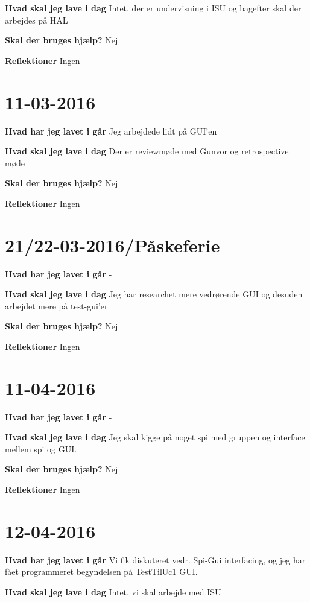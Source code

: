 \documentclass{article}
\begin{document}
	\textbf{Hvad skal jeg lave i dag} Intet, der er undervisning i ISU og bagefter skal der arbejdes på HAL
	
	\textbf{Skal der bruges hjælp?} Nej
	
	\textbf{Reflektioner} Ingen
	
	\section{11-03-2016}
	
	\textbf{Hvad har jeg lavet i går} Jeg arbejdede lidt på GUI'en
	
	\textbf{Hvad skal jeg lave i dag} Der er reviewmøde med Gunvor og retrospective møde
	
	\textbf{Skal der bruges hjælp?} Nej
	
	\textbf{Reflektioner} Ingen
	
	\section{21/22-03-2016/Påskeferie}
	
	\textbf{Hvad har jeg lavet i går} -
	
	\textbf{Hvad skal jeg lave i dag} Jeg har researchet mere vedrørende GUI og desuden arbejdet mere på test-gui'er
	
	\textbf{Skal der bruges hjælp?} Nej
	
	\textbf{Reflektioner} Ingen
	
	\section{11-04-2016}
		
	\textbf{Hvad har jeg lavet i går} -
		
	\textbf{Hvad skal jeg lave i dag} Jeg skal kigge på noget spi med gruppen og interface mellem spi og GUI.
		
	\textbf{Skal der bruges hjælp?} Nej
		
	\textbf{Reflektioner} Ingen
	
	
	\section{12-04-2016}
	
	\textbf{Hvad har jeg lavet i går} Vi fik diskuteret vedr. Spi-Gui interfacing, og jeg har fået programmeret begyndelsen på TestTilUc1 GUI.
	
	\textbf{Hvad skal jeg lave i dag} Intet, vi skal arbejde med ISU
	
\end{document}
